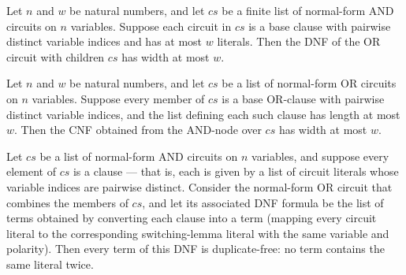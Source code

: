 \begin{theorem}
\label{BoolCircuit.NOrCircuit.toDNF_width_bounded}
\leanok
{}
Let $n$ and $w$ be natural numbers, and let $cs$ be a finite list of normal-form AND
circuits on $n$ variables. Suppose each circuit in $cs$ is a base clause with pairwise
distinct variable indices and has at most $w$ literals. Then the DNF of the OR circuit
with children $cs$ has width at most $w$.
\end{theorem}

\begin{theorem}
\label{BoolCircuit.NAndCircuit.toCNF_width_bounded}
\leanok
{}
Let $n$ and $w$ be natural numbers, and let $cs$ be a list of normal-form OR circuits on
$n$ variables. Suppose every member of $cs$ is a base OR-clause with pairwise distinct
variable indices, and the list defining each such clause has length at most $w$. Then
the CNF obtained from the AND-node over $cs$ has width at most $w$.
\end{theorem}

\begin{theorem}
\label{BoolCircuit.NOrCircuit.toDNF_terms_nodup}
\leanok
{}
Let $cs$ be a list of normal-form AND circuits on $n$ variables, and suppose every
element of $cs$ is a clause — that is, each is given by a list of circuit literals whose
variable indices are pairwise distinct. Consider the normal-form OR circuit that
combines the members of $cs$, and let its associated DNF formula be the list of terms
obtained by converting each clause into a term (mapping every circuit literal to the
corresponding switching-lemma literal with the same variable and polarity). Then every
term of this DNF is duplicate-free: no term contains the same literal twice.
\end{theorem}

